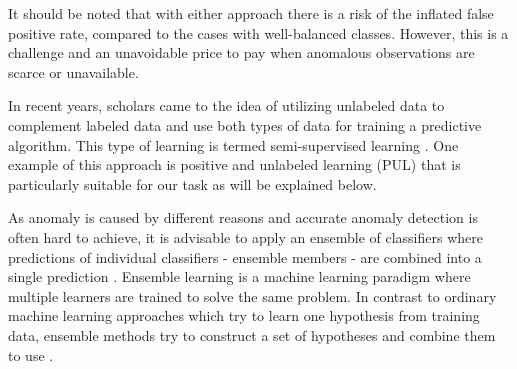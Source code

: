 It should be noted that with either approach there is a risk of the inflated false positive rate, compared to the cases with well-balanced classes. However, this is a challenge and an unavoidable price to pay when anomalous observations are scarce or unavailable.

In recent years, scholars came to the idea of utilizing unlabeled data to complement labeled data and use both types of data for training a predictive algorithm. This type of learning is termed semi-supervised learning \cite{Zhu:2008}. One example of this approach is positive and unlabeled learning (PUL) \cite{Elkan:2008:LCO:1401890.1401920} that is particularly suitable for our task as will be explained below.

As anomaly is caused by different reasons and accurate anomaly detection is often hard to achieve, it is advisable to apply an ensemble of classifiers where predictions of individual classifiers - ensemble members - are combined into a single prediction \cite{Seni:2010:EMD:1841412}. 
Ensemble learning is a machine learning paradigm where multiple learners are trained to solve the same problem. In contrast
to ordinary machine learning approaches which try to learn one hypothesis from training data, ensemble methods try to
construct a set of hypotheses and combine them to use \cite{Zhou:2012}.




